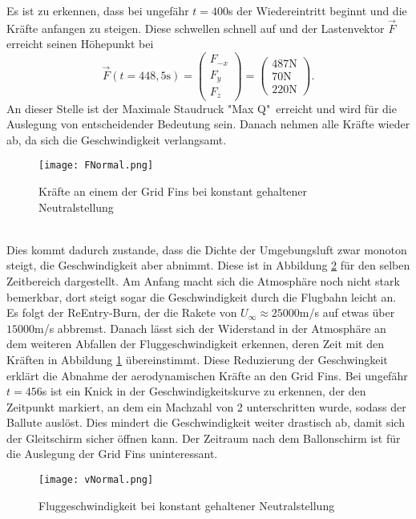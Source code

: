 Es ist zu erkennen, dass bei ungefähr $t=400$s der Wiedereintritt beginnt und die Kräfte anfangen zu steigen. Diese schwellen schnell auf und der Lastenvektor $\vec{F}$ erreicht seinen Höhepunkt bei
\begin{equation}
	\vec{F}(t=448,5\mathrm{s})=
		\left(\begin{array}{c}F_{-x}\\F_y\\F_z\end{array}\right)
			=\left(\begin{array}{c}487\mathrm{N}\\70\mathrm{N}\\220\mathrm{N}\end{array}\right).
\end{equation}
An dieser Stelle ist der Maximale Staudruck "Max Q"\ erreicht und wird für die Auslegung von entscheidender Bedeutung sein. Danach nehmen alle Kräfte wieder ab, da sich die Geschwindigkeit verlangsamt. 
\begin{figure}[h]
	\centering
	\texttt{[image: FNormal.png]}
	\caption{Kräfte an einem der Grid Fins bei konstant gehaltener Neutralstellung}
	\label{abb_KraefteNormal}
\end{figure}\\
Dies kommt dadurch zustande, dass die Dichte der Umgebungsluft zwar monoton steigt, die Geschwindigkeit aber abnimmt. Diese ist in Abbildung \ref{abb_vNormal} für den selben Zeitbereich dargestellt. Am Anfang macht sich die Atmosphäre noch nicht stark bemerkbar, dort steigt sogar die Geschwindigkeit durch die Flugbahn leicht an. Es folgt der ReEntry-Burn, der die Rakete von $U_\infty \approx 25000$m/s auf etwas über $15000$m/s abbremst. Danach lässt sich der Widerstand in der Atmosphäre an dem weiteren Abfallen der Fluggeschwindigkeit erkennen, deren Zeit mit den Kräften in Abbildung \ref{abb_KraefteNormal} übereinstimmt. Diese Reduzierung der Geschwingkeit erklärt die Abnahme der aerodynamischen Kräfte an den Grid Fins. Bei ungefähr $t=456$s ist ein Knick in der Geschwindigkeitskurve zu erkennen, der den Zeitpunkt markiert, an dem ein Machzahl von 2 unterschritten wurde, sodass der Ballute auslöst. Dies mindert die Geschwindigkeit weiter drastisch ab, damit sich der Gleitschirm sicher öffnen kann. Der Zeitraum nach dem Ballonschirm ist für die Auslegung der Grid Fins uninteressant.
\begin{figure}[h]
	\centering
	\texttt{[image: vNormal.png]}
	\caption{Fluggeschwindigkeit bei konstant gehaltener Neutralstellung}
	\label{abb_vNormal}
\end{figure}\\~\\
